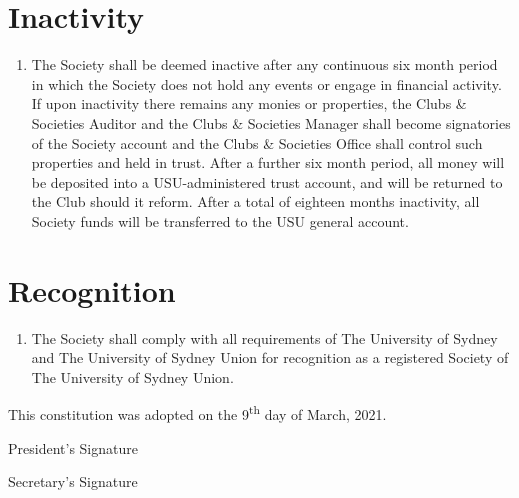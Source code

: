 \documentclass[11pt]{article}
\begin{document}
\section{Inactivity}
\begin{enumerate}[\thesection .1]
    \item The Society shall be deemed inactive after any continuous six month period in which the Society does not hold any events or engage in financial activity.  If upon inactivity there remains any monies or properties, the Clubs \& Societies Auditor and the Clubs \& Societies Manager shall become signatories of the Society account and the Clubs \& Societies Office shall control such properties and held in trust.  After a further six month period, all money will be deposited into a USU-administered trust account, and will be returned to the Club should it reform. After a total of eighteen months inactivity, all Society funds will be transferred to the USU general account.
\end{enumerate}


\section{Recognition}
\begin{enumerate}[\thesection .1]
    \item The Society shall comply with all requirements of The University of Sydney and The University of Sydney Union for recognition as a registered Society of The University of Sydney Union.
\end{enumerate}

\vspace{20mm}

This constitution was adopted on the 9\textsuperscript{th} day of March, 2021.

\vspace{20mm}
President's Signature \underline{\hspace{6cm}}

\vspace{20mm}
Secretary's Signature \underline{\hspace{6cm}}
\end{document}
